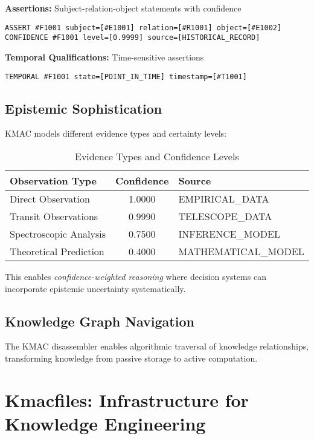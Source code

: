 \documentclass[conference]{IEEEtran}
\begin{document}
\textbf{Assertions:} Subject-relation-object statements with confidence
\begin{lstlisting}
ASSERT #F1001 subject=[#E1001] relation=[#R1001] object=[#E1002]
CONFIDENCE #F1001 level=[0.9999] source=[HISTORICAL_RECORD]
\end{lstlisting}

\textbf{Temporal Qualifications:} Time-sensitive assertions
\begin{lstlisting}
TEMPORAL #F1001 state=[POINT_IN_TIME] timestamp=[#T1001]
\end{lstlisting}

\subsection{Epistemic Sophistication}

KMAC models different evidence types and certainty levels:

\begin{table}[htbp]
\caption{Evidence Types and Confidence Levels}
\begin{center}
\begin{tabular}{|l|c|l|}
\hline
\textbf{Observation Type} & \textbf{Confidence} & \textbf{Source} \\
\hline
Direct Observation & 1.0000 & EMPIRICAL\_DATA \\
Transit Observations & 0.9990 & TELESCOPE\_DATA \\
Spectroscopic Analysis & 0.7500 & INFERENCE\_MODEL \\
Theoretical Prediction & 0.4000 & MATHEMATICAL\_MODEL \\
\hline
\end{tabular}
\end{center}
\label{tab:evidence_types}
\end{table}

This enables \emph{confidence-weighted reasoning} where decision systems can incorporate epistemic uncertainty systematically.

\subsection{Knowledge Graph Navigation}

The KMAC disassembler enables algorithmic traversal of knowledge relationships, transforming knowledge from passive storage to active computation.

\section{Kmacfiles: Infrastructure for Knowledge Engineering}
\end{document}
